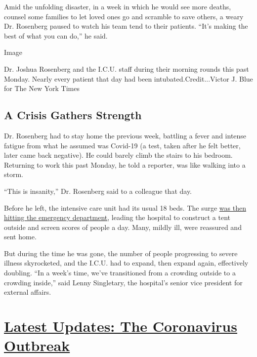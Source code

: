 Amid the unfolding disaster, in a week in which he would see more
deaths, counsel some families to let loved ones go and scramble to save
others, a weary Dr. Rosenberg paused to watch his team tend to their
patients. ``It's making the best of what you can do,'' he said.

Image

Dr. Joshua Rosenberg and the I.C.U. staff during their morning rounds
this past Monday. Nearly every patient that day had been
intubated.Credit...Victor J. Blue for The New York Times

\hypertarget{a-crisis-gathers-strength}{%
\subsection{A Crisis Gathers Strength}\label{a-crisis-gathers-strength}}

Dr. Rosenberg had to stay home the previous week, battling a fever and
intense fatigue from what he assumed was Covid-19 (a test, taken after
he felt better, later came back negative). He could barely climb the
stairs to his bedroom. Returning to work this past Monday, he told a
reporter, was like walking into a storm.

``This is insanity,'' Dr. Rosenberg said to a colleague that day.

Before he left, the intensive care unit had its usual 18 beds. The surge
\href{https://www.nytimes.com/2020/03/26/nyregion/coronavirus-brooklyn-hospital.html}{was
then hitting the emergency department}, leading the hospital to
construct a tent outside and screen scores of people a day. Many, mildly
ill, were reassured and sent home.

But during the time he was gone, the number of people progressing to
severe illness skyrocketed, and the I.C.U. had to expand, then expand
again, effectively doubling. ``In a week's time, we've transitioned from
a crowding outside to a crowding inside,'' said Lenny Singletary, the
hospital's senior vice president for external affairs.

\hypertarget{latest-updates-the-coronavirus-outbreak}{%
\section{\texorpdfstring{\href{https://www.nytimes.com/2020/08/07/world/covid-19-news.html?action=click\&pgtype=Article\&state=default\&region=MAIN_CONTENT_1\&context=storylines_live_updates}{Latest
Updates: The Coronavirus
Outbreak}}{Latest Updates: The Coronavirus Outbreak}}\label{latest-updates-the-coronavirus-outbreak}}

